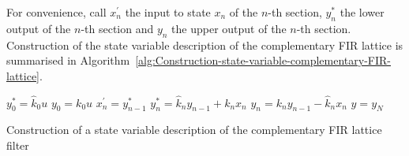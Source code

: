 \documentclass[a4paper,twoside,10pt,english]{report}
\begin{document}
For convenience, call $x_{n}^{\prime}$ the input to state $x_{n}$ of
the $n$-th section, $y_{n}^{*}$ the lower output of the $n$-th section
and $y_{n}$ the upper output of the $n$-th section. Construction of the
state variable description of the complementary FIR lattice is summarised in
Algorithm~\ref{alg:Construction-state-variable-complementary-FIR-lattice}.

\begin{algorithm}[!htbp]
\begin{algorithmic}
\State $y_{0}^{*} = \hat{k}_{0}u$
\State $y_{0} = k_{0}u$
  \State $x_{n}^{\prime} = y_{n-1}^{*}$
  \State $y_{n}^{*} = \hat{k}_{n}y_{n-1} + k_{n}x_{n}$
  \State $y_{n} = k_{n}y_{n-1} - \hat{k}_{n}x_{n}$
\EndFor
\State $y = y_{N}$
\end{algorithmic}
\caption{Construction of a state variable description of the complementary FIR lattice filter}
\label{alg:Construction-state-variable-complementary-FIR-lattice}
\end{algorithm}
\end{document}
